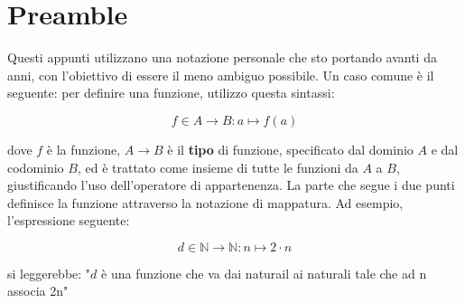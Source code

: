 \chapter{Preamble}
Questi appunti utilizzano una notazione personale che sto portando avanti da anni, con l'obiettivo di essere il meno ambiguo possibile. Un caso comune è il seguente: per definire una funzione, utilizzo questa sintassi:

\begin{equation}
f \in A \to B : a \mapsto f(a)
\end{equation}

dove $f$ è la funzione, $A \to B$ è il \textbf{tipo} di funzione, specificato dal dominio $A$ e dal codominio $B$, ed è trattato come insieme di tutte le funzioni da $A$ a $B$, giustificando l'uso dell'operatore di appartenenza. La parte che segue i due punti definisce la funzione attraverso la notazione di mappatura.
Ad esempio, l'espressione seguente:

\begin{equation}
d \in \mathbb{N} \to \mathbb{N} : n \mapsto 2\cdot n
\end{equation}

si leggerebbe: "$d$ è una funzione che va dai naturail ai naturali tale che ad n associa 2n"